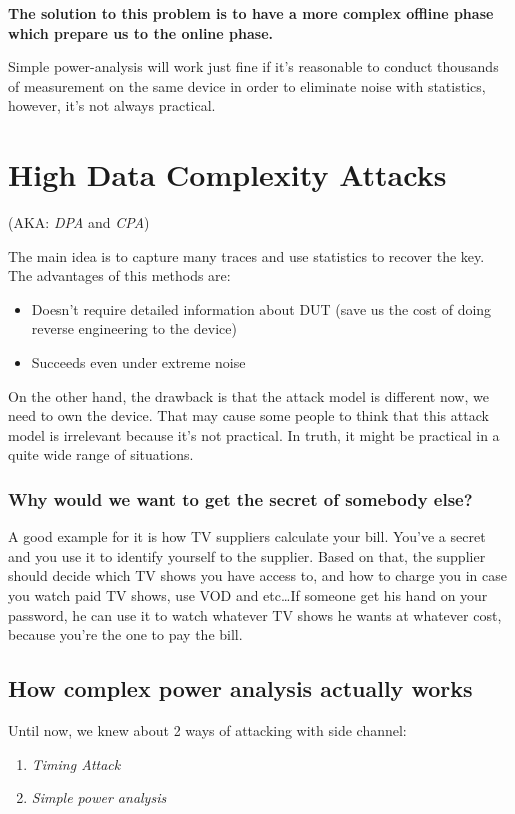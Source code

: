 \textbf{The solution to this problem is to have a more complex offline phase which prepare us to the online phase.}

Simple power-analysis will work just fine if it's reasonable to conduct thousands of measurement on the same device in order to eliminate noise with statistics, however, it's not always practical.

\section{High Data Complexity Attacks}

(AKA: \textit{DPA} and \textit{CPA})

The main idea is to capture many traces and use statistics to recover the key.
The advantages of this methods are:
\begin{itemize}
    \item Doesn't require detailed information about DUT (save us the cost of doing reverse engineering to the device)
    \item Succeeds even under extreme noise
\end{itemize}

On the other hand, the drawback is that the attack model is different now, we need to own the device. That may cause some people to think that this attack model is irrelevant because it's not practical. In truth, it might be practical in a quite wide range of situations.

\subsubsection{Why would we want to get the secret of somebody else?}

A good example for it is how TV suppliers calculate your bill. You've a secret and you use it to identify yourself to the supplier. Based on that, the supplier should decide which TV shows you have access to, and how to charge you in case you watch paid TV shows, use VOD and etc\ldots If someone get his hand on your password, he can use it to watch whatever TV shows he wants at whatever cost, because you're the one to pay the bill.

\subsection{How complex power analysis actually works}

Until now, we knew about 2 ways of attacking with side channel:
\begin{enumerate}
    \item \textit{Timing Attack}
    \item \textit{Simple power analysis}
\end{enumerate}

